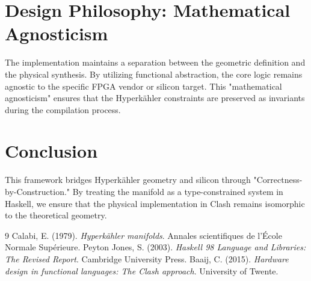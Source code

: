 \documentclass{article}
\begin{document}
\section{Design Philosophy: Mathematical Agnosticism}
The implementation maintains a separation between the geometric definition and the physical synthesis. By utilizing functional abstraction, the core logic remains agnostic to the specific FPGA vendor or silicon target. This "mathematical agnosticism" ensures that the Hyperkähler constraints are preserved as invariants during the compilation process.

\section{Conclusion}
This framework bridges Hyperkähler geometry and silicon through "Correctness-by-Construction." By treating the manifold as a type-constrained system in Haskell, we ensure that the physical implementation in Clash remains isomorphic to the theoretical geometry.

\begin{thebibliography}{9}
Calabi, E. (1979). \textit{Hyperkähler manifolds}. Annales scientifiques de l'École Normale Supérieure.
Peyton Jones, S. (2003). \textit{Haskell 98 Language and Libraries: The Revised Report}. Cambridge University Press.
Baaij, C. (2015). \textit{Hardware design in functional languages: The Clash approach}. University of Twente.
\end{thebibliography}
\end{document}
